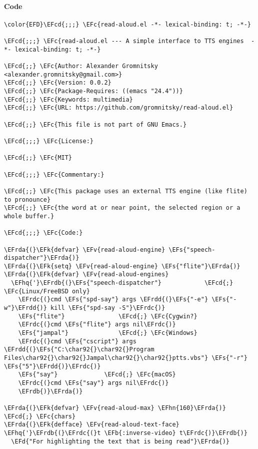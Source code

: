 \documentclass[a4wide,10pt]{article}
\newcommand{\EFc}[1]{\textcolor{EFc}{#1}} %
\newcommand{\EFcd}[1]{\textcolor{EFcd}{#1}} %
\newcommand{\EFs}[1]{\textcolor{EFs}{#1}} %
\newcommand{\EFd}[1]{\textcolor{EFd}{#1}} %
\newcommand{\EFk}[1]{\textcolor{EFk}{#1}} %
\newcommand{\EFb}[1]{\textcolor{EFb}{#1}} %
\newcommand{\EFv}[1]{\textcolor{EFv}{#1}} %
\newcommand{\EFhn}[1]{\textcolor{EFhn}{\textbf{#1}}} %
\newcommand{\EFhq}[1]{\textcolor{EFhq}{#1}} %
\newcommand{\EFrda}[1]{\textcolor{EFrda}{#1}} %
\newcommand{\EFrdb}[1]{\textcolor{EFrdb}{#1}} %
\newcommand{\EFrdc}[1]{\textcolor{EFrdc}{#1}} %
\newcommand{\EFrdd}[1]{\textcolor{EFrdd}{#1}} %
\begin{document}
\paragraph{Code}
\label{sec:orgda7ea41}
\begin{Code}
\begin{Verbatim}
\color{EFD}\EFcd{;;;} \EFc{read-aloud.el -*- lexical-binding: t; -*-}

\EFcd{;;;} \EFc{read-aloud.el --- A simple interface to TTS engines  -*- lexical-binding: t; -*-}

\EFcd{;;} \EFc{Author: Alexander Gromnitsky <alexander.gromnitsky@gmail.com>}
\EFcd{;;} \EFc{Version: 0.0.2}
\EFcd{;;} \EFc{Package-Requires: ((emacs "24.4"))}
\EFcd{;;} \EFc{Keywords: multimedia}
\EFcd{;;} \EFc{URL: https://github.com/gromnitsky/read-aloud.el}

\EFcd{;;} \EFc{This file is not part of GNU Emacs.}

\EFcd{;;;} \EFc{License:}

\EFcd{;;} \EFc{MIT}

\EFcd{;;;} \EFc{Commentary:}

\EFcd{;;} \EFc{This package uses an external TTS engine (like flite) to pronounce}
\EFcd{;;} \EFc{the word at or near point, the selected region or a whole buffer.}

\EFcd{;;;} \EFc{Code:}

\EFrda{(}\EFk{defvar} \EFv{read-aloud-engine} \EFs{"speech-dispatcher"}\EFrda{)}
\EFrda{(}\EFk{setq} \EFv{read-aloud-engine} \EFs{"flite"}\EFrda{)}
\EFrda{(}\EFk{defvar} \EFv{read-aloud-engines}
  \EFhq{'}\EFrdb{(}\EFs{"speech-dispatcher"}			\EFcd{;} \EFc{Linux/FreeBSD only}
    \EFrdc{(}cmd \EFs{"spd-say"} args \EFrdd{(}\EFs{"-e"} \EFs{"-w"}\EFrdd{)} kill \EFs{"spd-say -S"}\EFrdc{)}
    \EFs{"flite"}				\EFcd{;} \EFc{Cygwin?}
    \EFrdc{(}cmd \EFs{"flite"} args nil\EFrdc{)}
    \EFs{"jampal"}				\EFcd{;} \EFc{Windows}
    \EFrdc{(}cmd \EFs{"cscript"} args \EFrdd{(}\EFs{"C:\char92{}\char92{}Program Files\char92{}\char92{}Jampal\char92{}\char92{}ptts.vbs"} \EFs{"-r"} \EFs{"5"}\EFrdd{)}\EFrdc{)}
    \EFs{"say"}				\EFcd{;} \EFc{macOS}
    \EFrdc{(}cmd \EFs{"say"} args nil\EFrdc{)}
    \EFrdb{)}\EFrda{)}

\EFrda{(}\EFk{defvar} \EFv{read-aloud-max} \EFhn{160}\EFrda{)}		\EFcd{;} \EFc{chars}
\EFrda{(}\EFk{defface} \EFv{read-aloud-text-face} \EFhq{'}\EFrdb{(}\EFrdc{(}t \EFb{:inverse-video} t\EFrdc{)}\EFrdb{)}
  \EFd{"For highlighting the text that is being read"}\EFrda{)}




\end{Verbatim}
\end{Code}
\end{document}
